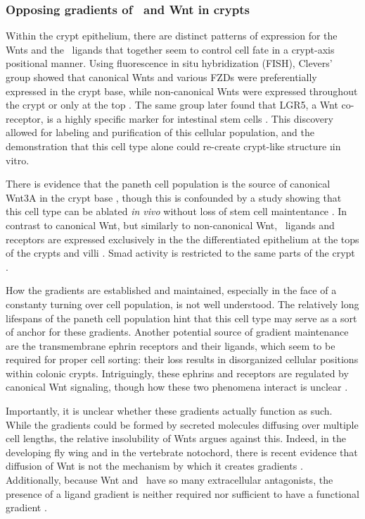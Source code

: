 \subsubsection{Opposing gradients of \tgfbsf\ and Wnt in crypts}


Within the crypt epithelium, there are distinct patterns of expression for
the Wnts and the \tgfbsf\ ligands that together seem to control cell
fate in a crypt-axis positional manner. Using fluorescence in situ hybridization
(FISH), Clevers' group showed that canonical Wnts and various FZDs were
preferentially expressed in the crypt base, while non-canonical Wnts were
expressed throughout the crypt or only at the top \cite{Gregorieff2005}.
The same group later found that LGR5, a Wnt co-receptor,
is a highly specific marker for intestinal stem cells \cite{Barker2007a}.
This discovery allowed for labeling and purification of this cellular population,
and the demonstration that this cell type alone could
re-create crypt-like structure \i{in vitro}.


There is evidence that the paneth cell population is the source
of canonical Wnt3A in the crypt base \cite{Sato2011b},
though this is confounded by a study showing that this cell
type can be ablated \textit{in vivo} without loss of stem cell maintentance
\cite{Rizk2012}.
In contrast to canonical Wnt, but similarly to non-canonical Wnt,
\tgfbsf\ ligands and receptors are expressed exclusively in the
the differentiated epithelium at the tops of the crypts
\cite{Hardwick2004,Massague1990}
and villi \cite{Yamada2013}. Smad activity is restricted to
the same parts of the crypt \cite{Hardwick2008,Libusova2010}.


How the gradients are established and maintained, especially in the face
of a constanty turning over cell population, is not well understood.
The relatively long lifespans of the paneth cell population
\cite{DeSantaBarbara2003} hint that this
cell type may serve as a sort of anchor for these gradients. Another
potential source of gradient maintenance are the transmembrane ephrin
receptors and their ligands, which seem to be required for proper cell sorting: their
loss results in disorganized cellular positions within colonic crypts.
Intriguingly, these ephrins and receptors are regulated by canonical Wnt signaling,
though how these two phenomena interact is unclear \cite{Batlle2002}.


Importantly, it is unclear whether these gradients actually function as such.
While the gradients could be formed by secreted molecules diffusing over
multiple cell lengths, the relative insolubility of Wnts argues against this.
Indeed, in the developing fly wing and in the vertebrate notochord, there is
recent evidence that diffusion of Wnt is not the mechanism by which it creates
gradients \cite{Alexandre2014,Serralbo2014}. Additionally, because Wnt and \tgfbsf\
have so many extracellular antagonists, the presence of a ligand gradient is neither
required nor sufficient to have a functional gradient \cite{Wakefield2013}.


